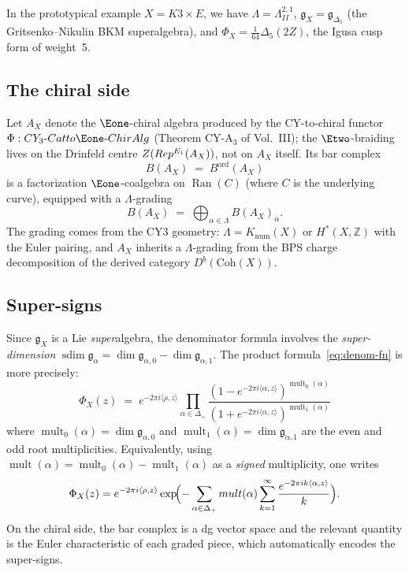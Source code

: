 \documentclass[11pt]{article}
\theoremstyle{definition}
\theoremstyle{remark}
\DeclareMathOperator{\Ran}{Ran}
\DeclareMathOperator{\mult}{mult}
\DeclareMathOperator{\sdim}{sdim}
\newcommand{\frakg}{\mathfrak{g}}
\begin{document}
In the prototypical example $X = K3 \times E$, we have $\Lambda = \Lambda^{2,1}_{II}$,
$\frakg_X = \frakg_{\Delta_5}$ (the Gritsenko--Nikulin BKM superalgebra), and
$\Phi_X = \frac{1}{64}\Delta_5(2Z)$, the Igusa cusp form of weight~5.

\subsection{The chiral side}

Let $A_X$ denote the $\Eone$-chiral algebra produced by the CY-to-chiral
functor $\Phi \colon \mathrm{CY}_3\text{-}\mathrm{Cat} \to \Eone\text{-}\mathrm{ChirAlg}$
(Theorem CY-A$_3$ of Vol.~III); the $\Etwo$-braiding lives on the Drinfeld
centre $Z(Rep^{E_1}(A_X))$, not on $A_X$ itself. Its bar complex
\[
 B(A_X) \;=\; B^{\mathrm{ord}}(A_X)
\]
is a factorization $\Eone$-coalgebra on $\Ran(C)$ (where $C$ is the
underlying curve), equipped with a $\Lambda$-grading
\begin{equation}
\label{eq:bar-grading}
 B(A_X) \;=\; \bigoplus_{\alpha \in \Lambda} B(A_X)_\alpha.
\end{equation}
The grading comes from the CY3 geometry: $\Lambda = K_{\mathrm{num}}(X)$
or $H^*(X,\mathbb{Z})$ with the Euler pairing, and $A_X$ inherits a
$\Lambda$-grading from the BPS charge decomposition of the derived
category $D^b(\mathrm{Coh}(X))$.

\subsection{Super-signs}
\label{sec:super-signs}

Since $\frakg_X$ is a Lie \emph{super}algebra, the denominator formula
involves the \emph{super-dimension} $\sdim \frakg_\alpha = \dim \frakg_{\alpha,0}
- \dim \frakg_{\alpha,1}$. The product formula~\eqref{eq:denom-fn} is more
precisely:
\begin{equation}
\label{eq:denom-super}
 \Phi_X(z)
 \;=\;
 e^{-2\pi i\langle \rho,z\rangle}
 \prod_{\alpha \in \Delta_+}
 \frac{(1 - e^{-2\pi i\langle\alpha,z\rangle})^{\mult_0(\alpha)}}
 {(1 + e^{-2\pi i\langle\alpha,z\rangle})^{\mult_1(\alpha)}}
\end{equation}
where $\mult_0(\alpha) = \dim\frakg_{\alpha,0}$ and
$\mult_1(\alpha) = \dim \frakg_{\alpha,1}$ are the even and odd root
multiplicities. Equivalently, using $\mult(\alpha) = \mult_0(\alpha) - \mult_1(\alpha)$
as a \emph{signed} multiplicity, one writes
\[
 \Phi_X(z)
 = e^{-2\pi i\langle\rho,z\rangle}
 \exp\!\Bigl(-\sum_{\alpha \in \Delta_+}
 \mult(\alpha) \sum_{k=1}^{\infty}
 \frac{e^{-2\pi ik\langle\alpha,z\rangle}}{k}\Bigr).
\]
On the chiral side, the bar complex is a dg vector space and the relevant
quantity is the Euler characteristic of each graded piece, which automatically
encodes the super-signs.
\end{document}
